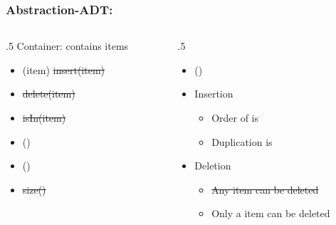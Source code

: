 \documentclass[aspectratio=169,10pt,compress]{beamer}
\begin{document}
\begin{frame}\frametitle{Abstraction-ADT: }
	\begin{columns}[T] %
	\begin{column}{.5\linewidth} %
	    	Container: contains items
		\begin{itemize}
			\item {}(item) \sout{insert(item)}
			\item {} \sout{delete(item)}
			\item \sout{isIn(item)}
			\item {}()
			\item {}()
			\item \sout{size()}			
		\end{itemize}
	\end{column} %
	\begin{column}{.5\linewidth} %
		\begin{itemize}

			\item
			 ()

			\item
			Insertion
			\begin{itemize}
				\item
				Order of is  
	
				\item
				Duplication is 
			\end{itemize}

			\item
			Deletion
			\begin{itemize}
				\item
				\sout{Any item can be deleted}
				
				\item
				Only a  item can be deleted
			\end{itemize}
		\end{itemize}
	\end{column} %
	\end{columns} %
\end{frame}




\end{document}
